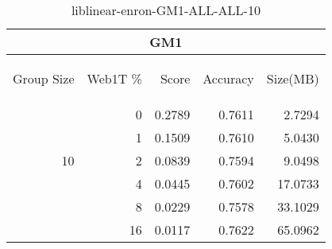 \begin{center}
\begin{table}[htbp]
\begin{tabular}{ | r | r | r | r | r |}
\hline
\multicolumn{5}{|c|}{GM1}\\
\hline
\begin{sideways}Group Size\end{sideways} & \begin{sideways}Web1T \%\end{sideways} & \begin{sideways}Score\end{sideways} & \begin{sideways}Accuracy\end{sideways} & \begin{sideways}Size(MB)\end{sideways}\\
\hline
\multirow{5}{*}{10}
 & 0 & 0.2789 & 0.7611 & 2.7294\\ \cline{2-5}
 & 1 & 0.1509 & 0.7610 & 5.0430\\ \cline{2-5}
 & 2 & 0.0839 & 0.7594 & 9.0498\\ \cline{2-5}
 & 4 & 0.0445 & 0.7602 & 17.0733\\ \cline{2-5}
 & 8 & 0.0229 & 0.7578 & 33.1029\\ \cline{2-5}
 & 16 & 0.0117 & 0.7622 & 65.0962\\ \cline{2-5}
\hline
\end{tabular}
\caption{liblinear-enron-GM1-ALL-ALL-10}
\label{table:liblinear-enron-GM1-ALL-ALL-10}
\end{table}
\end{center}

